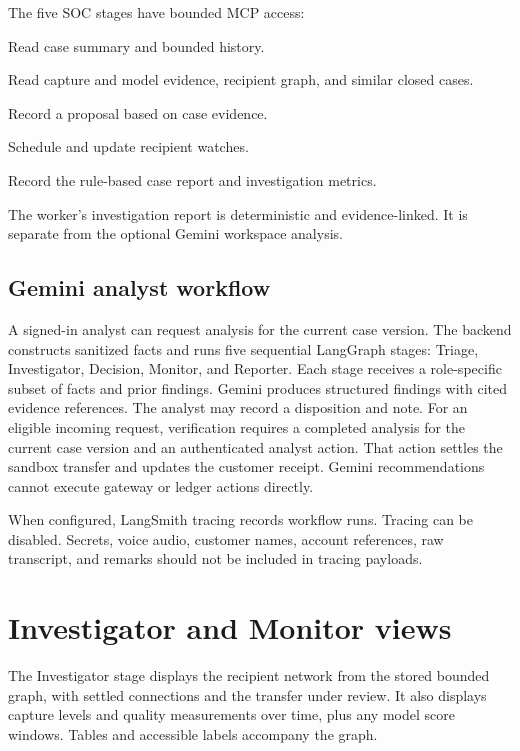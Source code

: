 \documentclass[11pt,a4paper]{article}
\begin{document}
The five SOC stages have bounded MCP access:
\begin{description}[style=nextline,leftmargin=27mm]
\item[Triage] Read case summary and bounded history.
\item[Investigator] Read capture and model evidence, recipient graph, and similar closed cases.
\item[Decision] Record a proposal based on case evidence.
\item[Monitor] Schedule and update recipient watches.
\item[Reporter] Record the rule-based case report and investigation metrics.
\end{description}
The worker's investigation report is deterministic and evidence-linked. It is separate from the optional Gemini workspace analysis.

\subsection{Gemini analyst workflow}
A signed-in analyst can request analysis for the current case version. The backend constructs sanitized facts and runs five sequential LangGraph stages: Triage, Investigator, Decision, Monitor, and Reporter. Each stage receives a role-specific subset of facts and prior findings. Gemini produces structured findings with cited evidence references. The analyst may record a disposition and note. For an eligible incoming request, verification requires a completed analysis for the current case version and an authenticated analyst action. That action settles the sandbox transfer and updates the customer receipt. Gemini recommendations cannot execute gateway or ledger actions directly.

When configured, LangSmith tracing records workflow runs. Tracing can be disabled. Secrets, voice audio, customer names, account references, raw transcript, and remarks should not be included in tracing payloads.

\section{Investigator and Monitor views}
The Investigator stage displays the recipient network from the stored bounded graph, with settled connections and the transfer under review. It also displays capture levels and quality measurements over time, plus any model score windows. Tables and accessible labels accompany the graph.
\end{document}
